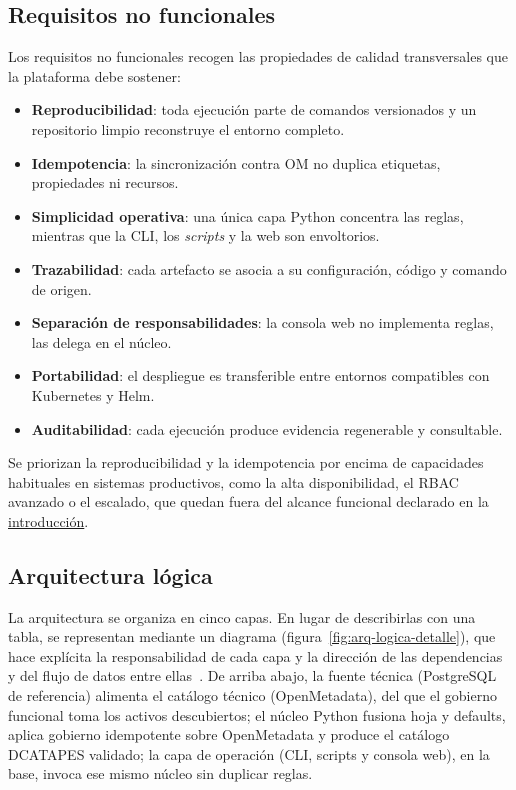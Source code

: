\subsection{Requisitos no funcionales}\label{sec:requisitos-no-funcionales}

Los requisitos no funcionales recogen las propiedades de calidad transversales que la plataforma debe sostener:

\begin{itemize}
  \item \textbf{Reproducibilidad}: toda ejecución parte de comandos versionados y un repositorio limpio reconstruye el entorno completo.
  \item \textbf{Idempotencia}: la sincronización contra \ac{OM} no duplica etiquetas, propiedades ni recursos.
  \item \textbf{Simplicidad operativa}: una única capa Python concentra las reglas, mientras que la \ac{CLI}, los \emph{scripts} y la web son envoltorios.
  \item \textbf{Trazabilidad}: cada artefacto se asocia a su configuración, código y comando de origen.
  \item \textbf{Separación de responsabilidades}: la consola web no implementa reglas, las delega en el núcleo.
  \item \textbf{Portabilidad}: el despliegue es transferible entre entornos compatibles con Kubernetes y Helm.
  \item \textbf{Auditabilidad}: cada ejecución produce evidencia regenerable y consultable.
\end{itemize}

Se priorizan la reproducibilidad y la idempotencia por encima de capacidades habituales en sistemas productivos, como la alta disponibilidad, el \ac{RBAC} avanzado o el escalado, que quedan fuera del alcance funcional declarado en la \hyperref[cap:introduccion]{introducción}.

\subsection{Arquitectura lógica}

La arquitectura se organiza en cinco capas. En lugar de describirlas con una tabla, se representan mediante un diagrama (figura~\ref{fig:arq-logica-detalle}), que hace explícita la responsabilidad de cada capa y la dirección de las dependencias y del flujo de datos entre ellas~\cite{mermaidDocs}. De arriba abajo, la fuente técnica (PostgreSQL de referencia) alimenta el catálogo técnico (OpenMetadata), del que el gobierno funcional toma los activos descubiertos; el núcleo Python fusiona hoja y defaults, aplica gobierno idempotente sobre OpenMetadata y produce el catálogo \ac{DCATAPES} validado; la capa de operación (\ac{CLI}, scripts y consola web), en la base, invoca ese mismo núcleo sin duplicar reglas.

